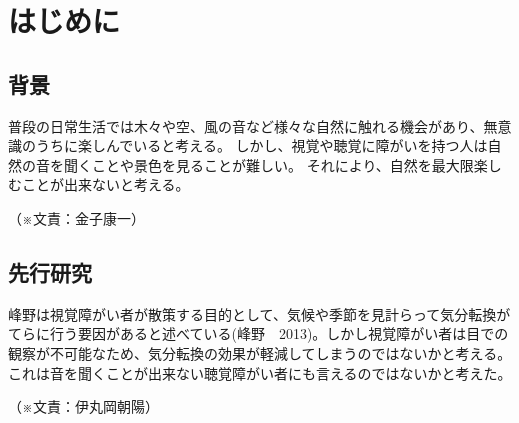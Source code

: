 \documentclass[11pt,a4paper]{report}
\newcommand{\Writer}[1]{
  \normalsize
  \begin{flushright}
    （※文責：#1）
  \end{flushright}
}
\begin{document}

\chapter{はじめに}
\section{背景}
\noindent\space
普段の日常生活では木々や空、風の音など様々な自然に触れる機会があり、無意識のうちに楽しんでいると考える。
しかし、視覚や聴覚に障がいを持つ人は自然の音を聞くことや景色を見ることが難しい。
それにより、自然を最大限楽しむことが出来ないと考える。
\Writer{金子康一}

\section{先行研究}
\noindent\space
峰野は視覚障がい者が散策する目的として、気候や季節を見計らって気分転換がてらに行う要因があると述べている(峰野　2013\cite{先行研究})。しかし視覚障がい者は目での観察が不可能なため、気分転換の効果が軽減してしまうのではないかと考える。これは音を聞くことが出来ない聴覚障がい者にも言えるのではないかと考えた。
\Writer{伊丸岡朝陽}
\end{document}
